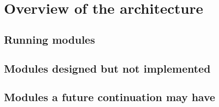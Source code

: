 \documentclass[a4paper,11pt]{article}
\begin{document}






\section{Overview of the architecture}
\subsection{Running modules}
\subsection{Modules designed but not implemented}
\subsection{Modules a future continuation may have}
\end{document}
